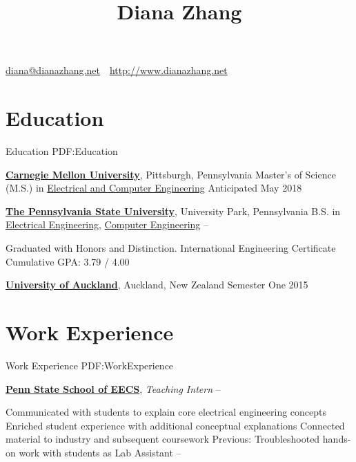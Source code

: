 \documentclass[letterpaper,10pt,oneside]{article}
\newcommand{\CVAuthor}{Diana Zhang}
\newcommand{\CVWebpage}{http://www.dianazhang.net}
\begin{document}

\title{\CVAuthor}

\begin{subtitle}
\par
\href{mailto:diana@dianazhang.net}
{diana@dianazhang.net}
\,\SubBulletSymbol\,
\href{\CVWebpage}
{\CVWebpage}
\end{subtitle}
\begin{body}


\section
{Education}
{Education}
{PDF:Education}

\href{http://www.cmu.edu/}
{\textbf{Carnegie Mellon University}},
Pittsburgh, Pennsylvania
\Item
Master's of Science (M.S.) in
\href{http://ece.cmu.edu/}
{Electrical and Computer Engineering}
\hfill
Anticipated May 2018

\GapNoBreak
\href{http://www.psu.edu}
{\textbf{The Pennsylvania State University}},
University Park, Pennsylvania
\Item
B.S. in
\href{http://ee.psu.edu/}
{Electrical Engineering,}
\href{http://cse.psu.edu/}
{Computer Engineering}
\hfill
{} --
\begin{detail}
\SubBulletItem
Graduated with Honors and Distinction.
\SubBulletItem
International Engineering Certificate
\SubBulletItem
Cumulative GPA: 3.79 / 4.00
\end{detail}

\GapNoBreak
\href{https://www.auckland.ac.nz/}
{\textbf{University of Auckland}},
Auckland, New Zealand
\hfill
Semester One 2015


\section
{Work Experience}
{Work Experience}
{PDF:WorkExperience}

\href{http://eecs.psu.edu/}
{\textbf{Penn State School of EECS}},
\textit{Teaching Intern}
\hfill
{} --
\begin{detail}
\SubBulletItem
Communicated with students to explain core electrical engineering concepts
\SubBulletItem
Enriched student experience with additional conceptual explanations
\SubBulletItem
Connected material to industry and subsequent coursework
\SubBulletItem
Previous: Troubleshooted hands-on work with students as Lab Assistant
\hfill
{} --
\end{detail}


\end{body}
\end{document}
